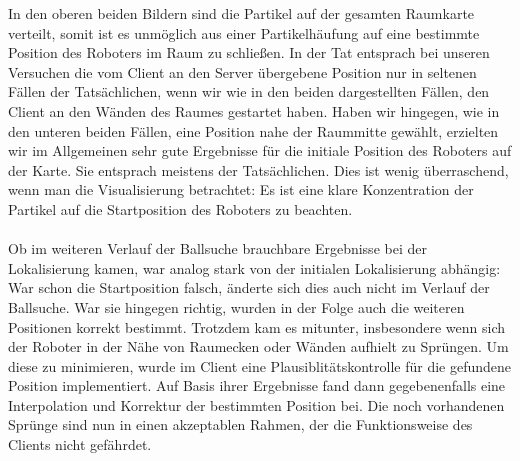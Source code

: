 In den oberen beiden Bildern sind die Partikel auf der gesamten
Raumkarte verteilt, somit ist es unmöglich aus einer Partikelhäufung
auf eine bestimmte Position des Roboters im Raum zu schließen. In der
Tat entsprach bei unseren Versuchen die vom Client an den Server
übergebene Position nur in seltenen Fällen der Tatsächlichen, wenn wir
wie in den beiden dargestellten Fällen, den Client an den Wänden des
Raumes gestartet haben. Haben wir hingegen, wie in den unteren beiden
Fällen, eine Position nahe der Raummitte gewählt, erzielten wir im
Allgemeinen sehr gute Ergebnisse für die initiale Position des
Roboters auf der Karte. Sie entsprach meistens der Tatsächlichen. Dies
ist wenig überraschend, wenn man die Visualisierung betrachtet: Es ist
eine klare Konzentration der Partikel auf die Startposition des
Roboters zu beachten. \\\\
Ob im weiteren Verlauf der Ballsuche brauchbare Ergebnisse bei der
Lokalisierung kamen, war analog stark von der initialen Lokalisierung
abhängig: War schon die Startposition falsch, änderte sich dies
auch nicht im Verlauf der Ballsuche. War sie hingegen richtig, wurden
in der Folge auch die weiteren Positionen korrekt bestimmt. Trotzdem
kam es mitunter, insbesondere wenn sich der Roboter in der Nähe von
Raumecken oder Wänden aufhielt zu Sprüngen. Um diese zu minimieren,
wurde im Client eine Plausiblitätskontrolle für die gefundene Position
implementiert. Auf Basis ihrer Ergebnisse fand dann gegebenenfalls
eine Interpolation und Korrektur der bestimmten Position bei. Die noch
vorhandenen Sprünge sind nun in einen akzeptablen Rahmen, der die
Funktionsweise des Clients nicht gefährdet.
